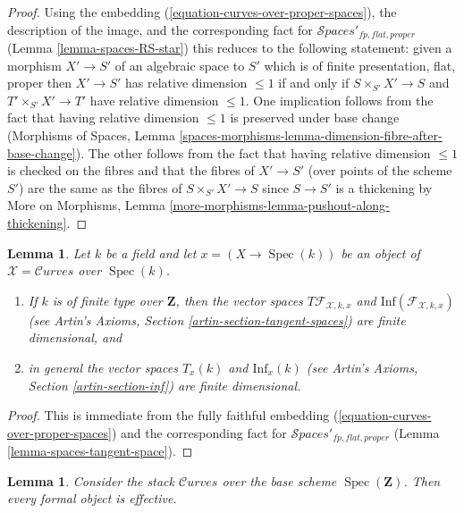 \documentclass{stacks-project}
\theoremstyle{plain}
\newtheorem{lemma}[subsection]{Lemma}
\theoremstyle{definition}
\theoremstyle{remark}
\numberwithin{equation}{subsection}
\def\Spec{\mathop{\mathrm{Spec}}}
\def\Spacesstack{\mathcal{S}\!\mathit{paces}}
\def\Curvesstack{\mathcal{C}\!\mathit{urves}}
\begin{document}
\begin{proof}
Using the embedding (\ref{equation-curves-over-proper-spaces}),
the description of the image, and
the corresponding fact for $\Spacesstack'_{fp, flat, proper}$
(Lemma \ref{lemma-spaces-RS-star})
this reduces to the following statement:
given a morphism $X' \to S'$ of an algebraic space to $S'$
which is of finite presentation, flat, proper then
$X' \to S'$ has relative dimension $\leq 1$
if and only if $S \times_{S'} X' \to S$
and $T' \times_{S'} X' \to T'$ have relative dimension $\leq 1$.
One implication follows from the fact that
having relative dimension $\leq 1$ is preserved under base change
(Morphisms of Spaces, Lemma
\ref{spaces-morphisms-lemma-dimension-fibre-after-base-change}).
The other follows from the fact that having relative
dimension $\leq 1$ is checked on the fibres and that
the fibres of $X' \to S'$ (over points of the scheme $S'$)
are the same as the fibres of $S \times_{S'} X' \to S$
since $S \to S'$ is a thickening by
More on Morphisms, Lemma \ref{more-morphisms-lemma-pushout-along-thickening}.
\end{proof}

\begin{lemma}
\label{lemma-curves-tangent-space}
Let $k$ be a field and let $x = (X \to \Spec(k))$ be an object of
$\mathcal{X} = \Curvesstack$ over $\Spec(k)$.
\begin{enumerate}
\item If $k$ is of finite type over $\mathbf{Z}$, then
the vector spaces $T\mathcal{F}_{\mathcal{X}, k, x}$ and
$\text{Inf}(\mathcal{F}_{\mathcal{X}, k, x})$
(see Artin's Axioms, Section \ref{artin-section-tangent-spaces})
are finite dimensional, and
\item in general the vector spaces $T_x(k)$ and $\text{Inf}_x(k)$
(see Artin's Axioms, Section \ref{artin-section-inf})
are finite dimensional.
\end{enumerate}
\end{lemma}

\begin{proof}
This is immediate from the fully faithful embedding
(\ref{equation-curves-over-proper-spaces}) and
the corresponding fact for $\Spacesstack'_{fp, flat, proper}$
(Lemma \ref{lemma-spaces-tangent-space}).
\end{proof}

\begin{lemma}
\label{lemma-curves-existence}
Consider the stack $\Curvesstack$ over the base
scheme $\Spec(\mathbf{Z})$. Then every formal object is effective.
\end{lemma}
\end{document}
